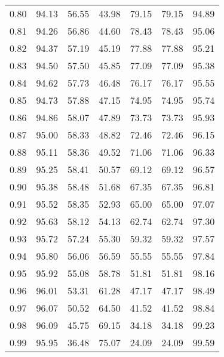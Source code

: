\begin{tabular}{|c|c|c|c|c|c|c|}
      0.80 &     94.13 &     56.55 &      43.98 &   79.15 &      79.15 &         94.89 \\
      0.81 &     94.26 &     56.86 &      44.60 &   78.43 &      78.43 &         95.06 \\
      0.82 &     94.37 &     57.19 &      45.19 &   77.88 &      77.88 &         95.21 \\
      0.83 &     94.50 &     57.50 &      45.85 &   77.09 &      77.09 &         95.38 \\
      0.84 &     94.62 &     57.73 &      46.48 &   76.17 &      76.17 &         95.55 \\
      0.85 &     94.73 &     57.88 &      47.15 &   74.95 &      74.95 &         95.74 \\
      0.86 &     94.86 &     58.07 &      47.89 &   73.73 &      73.73 &         95.93 \\
      0.87 &     95.00 &     58.33 &      48.82 &   72.46 &      72.46 &         96.15 \\
      0.88 &     95.11 &     58.36 &      49.52 &   71.06 &      71.06 &         96.33 \\
      0.89 &     95.25 &     58.41 &      50.57 &   69.12 &      69.12 &         96.57 \\
      0.90 &     95.38 &     58.48 &      51.68 &   67.35 &      67.35 &         96.81 \\
      0.91 &     95.52 &     58.35 &      52.93 &   65.00 &      65.00 &         97.07 \\
      0.92 &     95.63 &     58.12 &      54.13 &   62.74 &      62.74 &         97.30 \\
      0.93 &     95.72 &     57.24 &      55.30 &   59.32 &      59.32 &         97.57 \\
      0.94 &     95.80 &     56.06 &      56.59 &   55.55 &      55.55 &         97.84 \\
      0.95 &     95.92 &     55.08 &      58.78 &   51.81 &      51.81 &         98.16 \\
      0.96 &     96.01 &     53.31 &      61.28 &   47.17 &      47.17 &         98.49 \\
      0.97 &     96.07 &     50.52 &      64.50 &   41.52 &      41.52 &         98.84 \\
      0.98 &     96.09 &     45.75 &      69.15 &   34.18 &      34.18 &         99.23 \\
      0.99 &     95.95 &     36.48 &      75.07 &   24.09 &      24.09 &         99.59 \\
\bottomrule
\end{tabular}
